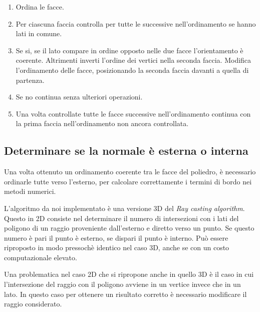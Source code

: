 \documentclass[oneside,12pt]{book}  %
\theoremstyle{plain}
\theoremstyle{definition}
\theoremstyle{remark}
\numberwithin{equation}{chapter} %
\begin{document}
\begin{enumerate}
\item Ordina le facce.
\item Per ciascuna faccia controlla per tutte le successive
  nell'ordinamento se hanno lati in comune.
\item Se si, se il lato compare in ordine opposto nelle due facce
  l'orientamento \`e coerente. Altrimenti inverti l'ordine dei vertici
  nella seconda faccia. Modifica l'ordinamento delle facce,
  posizionando la seconda faccia davanti a quella
  di partenza.

\item Se no continua senza ulteriori operazioni.

\item Una volta controllate tutte le facce successive nell'ordinamento
  continua con la prima faccia nell'ordinamento non ancora controllata.

\end{enumerate}

\subsection{Determinare se la normale \`e esterna o interna}
Una volta ottenuto un ordinamento coerente tra le facce del poliedro,
\`e necessario ordinarle tutte verso l'esterno, per calcolare
correttamente i termini di bordo nei metodi numerici.

L'algoritmo da noi implementato \`e una versione 3D del \textit{Ray
  casting algorithm}. Questo in 2D consiste nel determinare il numero di
intersezioni con i lati del poligono di un raggio proveniente
dall'esterno e diretto verso un punto. Se questo numero \`e pari il
punto \`e esterno, se dispari il punto \`e interno. Pu\`o essere
riproposto in modo pressoch\`e identico nel caso 3D, anche se con un
costo computazionale elevato.

Una problematica nel caso 2D che si ripropone anche in quello 3D \`e
il caso in cui l'intersezione del raggio con il poligono avviene in un
vertice invece che in un lato. In questo caso per ottenere un
risultato corretto \`e necessario modificare il raggio considerato. 
\end{document}
